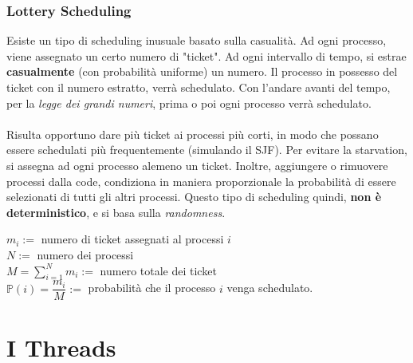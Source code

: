\documentclass[12pt, letterpaper]{article}
\newcommand{\acc}{\\\hphantom{}\\}
\begin{document}
\subsubsection{Lottery Scheduling} 
Esiste un tipo di scheduling inusuale basato sulla casualità. Ad ogni processo, viene assegnato un certo 
numero di "ticket". Ad ogni intervallo di tempo, si estrae \textbf{casualmente} (con probabilità uniforme) un 
numero. Il processo in possesso del ticket con il numero estratto, verrà schedulato. Con l'andare avanti del tempo, 
per la \textit{legge dei grandi numeri}, prima o poi ogni processo verrà schedulato. \acc 
Risulta opportuno dare più ticket ai processi più corti, in modo che possano essere schedulati 
più frequentemente (simulando il SJF). Per evitare la starvation, si assegna ad ogni processo 
alemeno un ticket. Inoltre, aggiungere o rimuovere processi dalla code, condiziona in maniera proporzionale 
la probabilità di essere selezionati di tutti gli altri processi. Questo tipo di scheduling quindi, \textbf{non è 
deterministico}, e si basa sulla \textit{randomness}.\begin{center}
    \(m_i:=\)  numero di ticket assegnati al processi \(i\)\\\(N:=\) numero dei processi \\\(M=\displaystyle\sum_{i=1}^Nm_i:=\) numero totale dei ticket\\
\(\mathbb{P}(i)=\dfrac{m_i}{M}:=\) probabilità che il processo \(i\) venga schedulato.
\end{center}
\section{I Threads}
\end{document}
